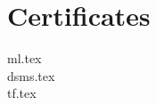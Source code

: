 \documentclass[]{deedy-resume-openfont}
\begin{document}
\sectionsep

\section{Certificates}
{ml.tex}
\vspace{\topsep}\\
{dsms.tex}
\vspace{\topsep}\\
{tf.tex}




\end{document}
